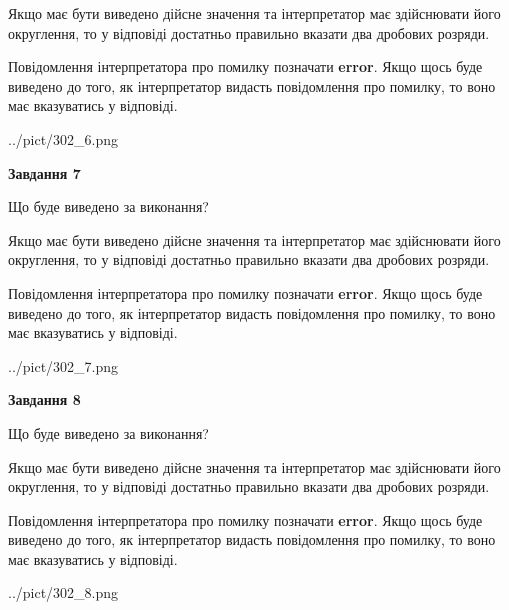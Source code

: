 \documentclass[12pt, ukrainian]{article}
\begin{document}
{\begin {Large}
Якщо має бути виведено дійсне значення та інтерпретатор має здійснювати його округлення, 
то у відповіді достатньо правильно вказати два дробових розряди.

Повідомлення інтерпретатора про помилку позначати \textbf{error}.
Якщо щось буде виведено до того, як інтерпретатор видасть повідомлення про помилку, 
то воно має вказуватись у відповіді. \par

\begin{center}
	{../pict/302_6.png}
\end{center}
\newpage

{\begin {center}\textbf{Завдання 7}\end {center}}\par
Що буде виведено за виконання? \par

Якщо має бути виведено дійсне значення та інтерпретатор має здійснювати його округлення, 
то у відповіді достатньо правильно вказати два дробових розряди.

Повідомлення інтерпретатора про помилку позначати \textbf{error}.
Якщо щось буде виведено до того, як інтерпретатор видасть повідомлення про помилку, 
то воно має вказуватись у відповіді. \par

\begin{center}
	{../pict/302_7.png}
\end{center}
\newpage

{\begin {center}\textbf{Завдання 8}\end {center}}\par
Що буде виведено за виконання? \par

Якщо має бути виведено дійсне значення та інтерпретатор має здійснювати його округлення, 
то у відповіді достатньо правильно вказати два дробових розряди.

Повідомлення інтерпретатора про помилку позначати \textbf{error}.
Якщо щось буде виведено до того, як інтерпретатор видасть повідомлення про помилку, 
то воно має вказуватись у відповіді. \par

\begin{center}
	{../pict/302_8.png}
\end{center}
\newpage


\end{Large}}
\end{document}
